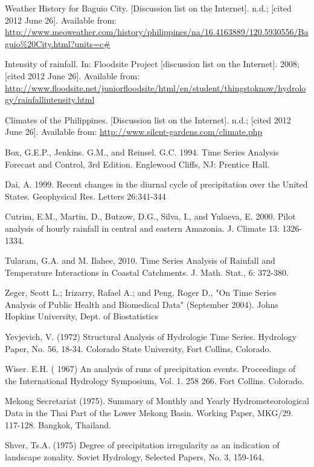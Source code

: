 \documentclass{pshscarc2013}
\begin{document}
\begin{thebibliography}{99\kern\bibindent}
 Weather History for Baguio City. [Discussion list on the Internet]. n.d.; [cited 2012 June 26]. Available from: \url{http://www.meoweather.com/history/philippines/na/16.4163889/120.5930556/Baguio%20City.html?units=c#}

 Intensity of rainfall. In: Floodsite Project [discussion list on the Internet]. 2008; [cited 2012 June 26]. Available from: \url{http://www.floodsite.net/juniorfloodsite/html/en/student/thingstoknow/hydrology/rainfallintensity.html}

 Climates of the Philippines. [Discussion list on the Internet]. n.d.; [cited 2012 June 26]. Available from: \url{http://www.silent-gardens.com/climate.php}

 Box, G.E.P.,  Jenkins. G.M., and Reinsel. G.C.  1994. Time Series Analysis Forecast and Control, 3rd Edition. Englewood Cliffs, NJ: Prentice Hall.

 Dai, A. 1999. Recent changes in the diurnal cycle of precipitation over the United States. Geophysical Res. Letters 26:341-344

 Cutrim,  E.M., Martin, D., Butzow, D.G., Silva, I., and Yulaeva, E. 2000. Pilot analysis of hourly rainfall in central and eastern Amazonia. J. Climate 13: 1326-1334.

 Tularam, G.A. and M. Ilahee, 2010. Time Series Analysis of Rainfall and Temperature Interactions in Coastal Catchments. J. Math. Stat., 6: 372-380.

Zeger, Scott L.; Irizarry, Rafael A.; and Peng, Roger D., "On Time Series Analysis of Public Health and Biomedical Data" (September 2004). Johns Hopkins University, Dept. of Biostatistics 

Yevjevich, V. (1972) Structural Analysis of Hydrologie Time Series. Hydrology Paper, No. 56, 18-34. Colorado State University, Fort Collins, Colorado.

Wiser. E.H. ( 1967) An analysis of runs of precipitation events. Proceedings of the International Hydrology Symposium, Vol. 1. 258 266. Fort Collins. Colorado.

Mekong Secretariat (1975). Summary of Monthly and Yearly Hydrometeorological Data in the Thai Part of the Lower Mekong Basin. Working Paper, MKG/29. 117-128. Bangkok, Thailand.

Shver, Ts.A. (1975) Degree of precipitation irregularity as an indication of landscape zonality. Soviet Hydrology, Selected Papers, No. 3, 159-164.


\end{thebibliography}
\end{document}
